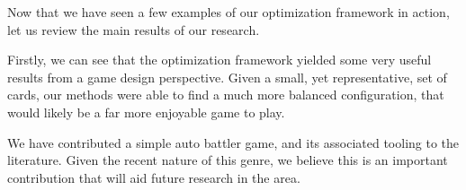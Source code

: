 Now that we have seen a few examples of our optimization framework in action, let us review the main results of our research. 

Firstly, we can see that the optimization framework yielded some very useful results from a game design perspective. Given a small, yet representative, set of cards, our methods were able to find a much more balanced configuration, that would likely be a far more enjoyable game to play. 

We have contributed a simple auto battler game, and its associated tooling to the literature. Given the recent nature of this genre, we believe this is an important contribution that will aid future research in the area.   